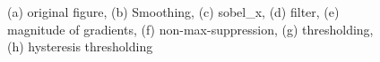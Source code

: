 \documentclass[final]{cvpr}
\begin{document}
\begin{appendices}
\begin{figure}[h]
{  }
  \quad
  \quad
  \caption{(a) original figure, (b) Smoothing, (c) sobel\_x, (d) filter, (e) magnitude of gradients, (f) non-max-suppression, (g) thresholding, (h) hysteresis thresholding}
  \label{fig:cannyall}
  \end{figure}
  
  


\end{appendices}
\end{document}
